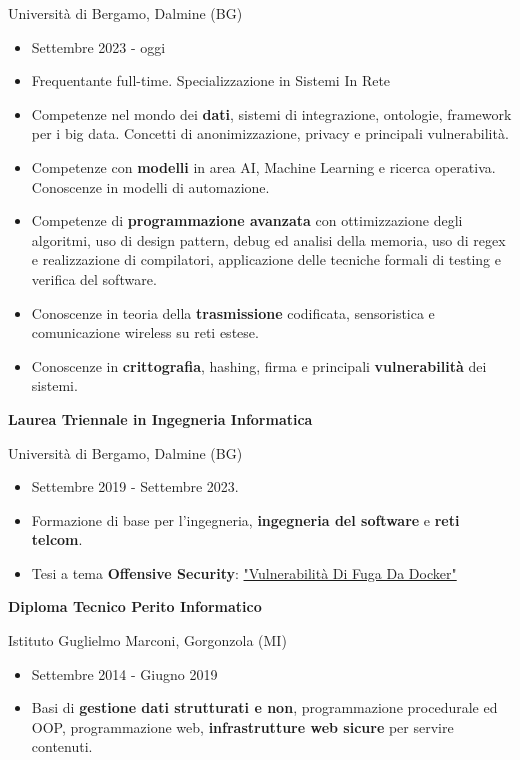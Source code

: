 \documentclass[a4paper]{letter}
\begin{document}
\begin{minipage}[t]{0.65\textwidth}
{\small Università di Bergamo, Dalmine (BG)}
\begin{itemize}
    \item Settembre 2023 - oggi
    \item Frequentante full-time. Specializzazione in Sistemi In Rete
\item Competenze nel mondo dei \textbf{dati}, sistemi di integrazione, ontologie, framework per i big data. Concetti di anonimizzazione, privacy e principali vulnerabilità.
\item Competenze con \textbf{modelli} in area AI, Machine Learning e ricerca operativa. Conoscenze in modelli di automazione. 
\item Competenze di \textbf{programmazione avanzata} con ottimizzazione degli algoritmi, uso di design pattern, debug ed analisi della memoria, uso di regex e realizzazione di compilatori, applicazione delle tecniche formali di testing e verifica del software.
\item Conoscenze in teoria della \textbf{trasmissione} codificata, sensoristica e comunicazione wireless su reti estese.
\item Conoscenze in \textbf{crittografia}, hashing, firma e principali \textbf{vulnerabilità} dei sistemi.\end{itemize}
{\large \textbf{Laurea Triennale in Ingegneria Informatica} }

{\small Università di Bergamo, Dalmine (BG)}
\begin{itemize}
    \item Settembre 2019 - Settembre 2023.
\item Formazione di base per l'ingegneria, \textbf{ingegneria del software} e \textbf{reti telcom}. 
\item Tesi a tema \textbf{Offensive Security}: \href{https://github.com/giorgio-hash/tesi-triennio}{"Vulnerabilità Di Fuga Da Docker"}
 \end{itemize}

{\large \textbf{Diploma Tecnico Perito Informatico}}

{\small Istituto Guglielmo Marconi, Gorgonzola (MI)}
\begin{itemize}
    \item Settembre 2014 - Giugno 2019
    \item Basi di \textbf{gestione dati strutturati e non}, programmazione procedurale ed OOP, programmazione web, \textbf{infrastrutture web sicure} per servire contenuti.
\end{itemize}


\end{minipage}
\end{document}
